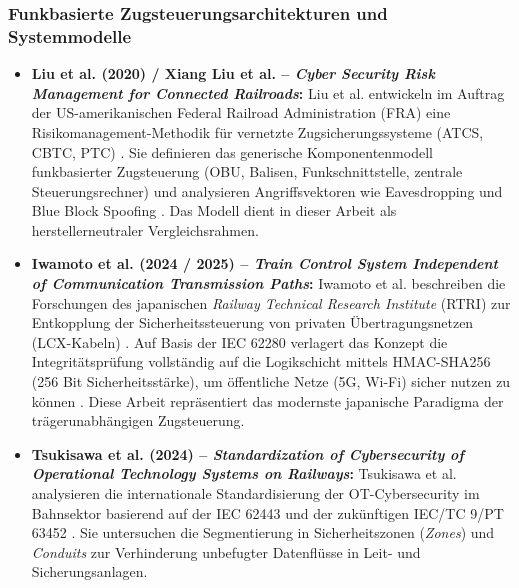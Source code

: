 \documentclass[runningheads]{res/llncs}
\begin{document}
\subsubsection{Funkbasierte Zugsteuerungsarchitekturen und Systemmodelle}
\begin{itemize}
    \item \textbf{Liu et al. (2020) / Xiang Liu et al. -- \textit{Cyber Security Risk Management for Connected Railroads}:}
    Liu et al. entwickeln im Auftrag der US-amerikanischen Federal Railroad Administration (FRA) eine Risikomanagement-Methodik für vernetzte Zugsicherungssysteme (ATCS, CBTC, PTC) \parencite[S. 1--15]{xiangliuCyber2020}. Sie definieren das generische Komponentenmodell funkbasierter Zugsteuerung (OBU, Balisen, Funkschnittstelle, zentrale Steuerungsrechner) und analysieren Angriffsvektoren wie Eavesdropping und Blue Block Spoofing \parencite[S. 10--15, 46--48]{xiangliuCyber2020}. Das Modell dient in dieser Arbeit als herstellerneutraler Vergleichsrahmen.

    \item \textbf{Iwamoto et al. (2024 / 2025) -- \textit{Train Control System Independent of Communication Transmission Paths}:}
    Iwamoto et al. beschreiben die Forschungen des japanischen \textit{Railway Technical Research Institute} (RTRI) zur Entkopplung der Sicherheitssteuerung von privaten Übertragungsnetzen (LCX-Kabeln) \parencite[S. 1--5]{iwamotoTrain2024}. Auf Basis der IEC 62280 verlagert das Konzept die Integritätsprüfung vollständig auf die Logikschicht mittels HMAC-SHA256 (256 Bit Sicherheitsstärke), um öffentliche Netze (5G, Wi-Fi) sicher nutzen zu können \parencite[S. 10--12]{iwamotoTrain2024}. Diese Arbeit repräsentiert das modernste japanische Paradigma der trägerunabhängigen Zugsteuerung.

    \item \textbf{Tsukisawa et al. (2024) -- \textit{Standardization of Cybersecurity of Operational Technology Systems on Railways}:}
    Tsukisawa et al. analysieren die internationale Standardisierung der OT-Cybersecurity im Bahnsektor basierend auf der IEC 62443 und der zukünftigen IEC/TC 9/PT 63452 \parencite[S. 41--43]{h.tsukisawaStandardization2024}. Sie untersuchen die Segmentierung in Sicherheitszonen (\textit{Zones}) und \textit{Conduits} zur Verhinderung unbefugter Datenflüsse in Leit- und Sicherungsanlagen.
\end{itemize}
\end{document}
